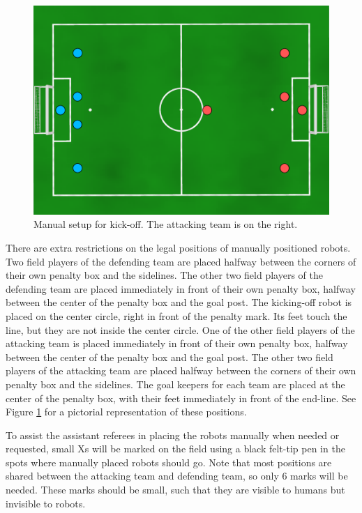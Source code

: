 \documentclass[12pt]{article}
\begin{document}
\begin{figure}[t]
\centerline{\includegraphics[width=\columnwidth]{figs/manual-placement-2015.pdf}}
\caption{Manual setup for kick-off.  The attacking team is on the right.}
\label{fig:ko}
\end{figure}

There are extra restrictions on the legal positions of manually positioned robots. Two field players of the defending team are placed halfway between the corners of their own penalty box and the sidelines. The other two field players of the defending team are placed immediately in front of their own penalty box, halfway between the center of the penalty box and the goal post.  The kicking-off robot is placed on the center circle, right in front of the penalty mark. Its feet touch the line, but they are not inside the center circle. 
One of the other field players of the attacking team is placed immediately in front of their own penalty box, halfway between the center of the penalty box and the goal post. The other two field players of the attacking team are placed halfway between the corners of their own penalty box and the sidelines. 
  The goal keepers for each team are placed at the center of the penalty box, with their feet immediately in front of the end-line. See Figure \ref{fig:ko} for a pictorial representation of these positions.

To assist the assistant referees in placing the robots manually when needed or requested, small Xs will be marked on the field using a black felt-tip pen in the spots where manually placed robots should go.  Note that most positions are shared between the attacking team and defending team, so only 6 marks will be needed.  These marks should be small, such that they are visible to humans but invisible to robots.
\end{document}
